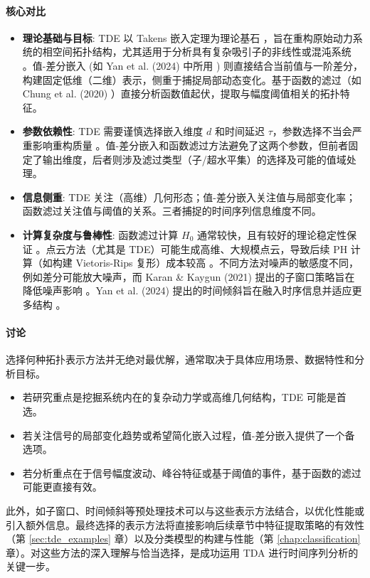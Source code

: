 \paragraph{核心对比}
\begin{itemize}
    \item \textbf{理论基础与目标}: TDE 以 Takens 嵌入定理为理论基石 \cite{Takens1981DetectingStrangeAttractors}，旨在重构原始动力系统的相空间拓扑结构，尤其适用于分析具有复杂吸引子的非线性或混沌系统 \cite{Umeda2017TSClassificationViaTDA}。值-差分嵌入 (如 Yan et al. (2024) 中所用 \cite{Yan2024PHTSI}) 则直接结合当前值与一阶差分，构建固定低维（二维）表示，侧重于捕捉局部动态变化。基于函数的滤过（如 Chung et al. (2020) \cite{Chung2020PHApproachTSC}）直接分析函数值起伏，提取与幅度阈值相关的拓扑特征。
    \item \textbf{参数依赖性}: TDE 需要谨慎选择嵌入维度 $d$ 和时间延迟 $\tau$，参数选择不当会严重影响重构质量 \cite{Karan2021TSClassificationViaTDA}。值-差分嵌入和函数滤过方法避免了这两个参数，但前者固定了输出维度，后者则涉及滤过类型（子/超水平集）的选择及可能的值域处理。
    \item \textbf{信息侧重}: TDE 关注（高维）几何形态；值-差分嵌入关注值与局部变化率；函数滤过关注值与阈值的关系。三者捕捉的时间序列信息维度不同。
    \item \textbf{计算复杂度与鲁棒性}: 函数滤过计算 $H_0$ 通常较快，且有较好的理论稳定性保证 \cite{Chung2020PHApproachTSC}。点云方法（尤其是 TDE）可能生成高维、大规模点云，导致后续 PH 计算（如构建 Vietoris-Rips 复形）成本较高 \cite{Yan2024PHTSI}。不同方法对噪声的敏感度不同，例如差分可能放大噪声，而 Karan \& Kaygun (2021) 提出的子窗口策略旨在降低噪声影响 \cite{Karan2021TSClassificationViaTDA}。Yan et al. (2024) 提出的时间倾斜旨在融入时序信息并适应更多结构 \cite{Yan2024PHTSI}。
\end{itemize}

\paragraph{讨论}
选择何种拓扑表示方法并无绝对最优解，通常取决于具体应用场景、数据特性和分析目标。
\begin{itemize}
    \item 若研究重点是挖掘系统内在的复杂动力学或高维几何结构，TDE 可能是首选。
    \item 若关注信号的局部变化趋势或希望简化嵌入过程，值-差分嵌入提供了一个备选项。
    \item 若分析重点在于信号幅度波动、峰谷特征或基于阈值的事件，基于函数的滤过可能更直接有效。
\end{itemize}
此外，如子窗口、时间倾斜等预处理技术可以与这些表示方法结合，以优化性能或引入额外信息。最终选择的表示方法将直接影响后续章节中特征提取策略的有效性（第 \ref{sec:tde_examples} 章）以及分类模型的构建与性能（第 \ref{chap:classification} 章）。对这些方法的深入理解与恰当选择，是成功运用 TDA 进行时间序列分析的关键一步。
